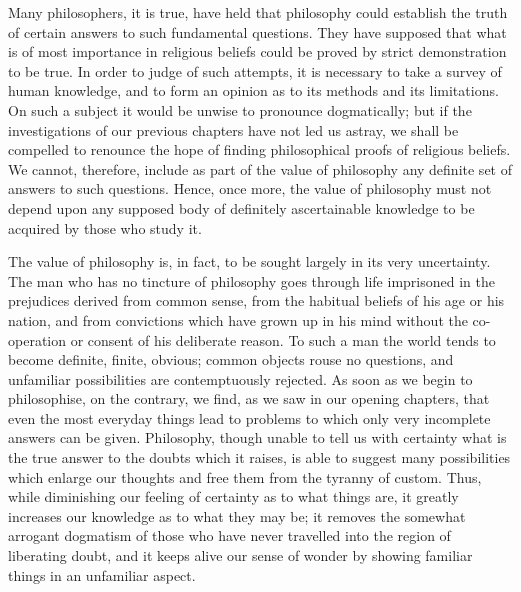 Many philosophers, it is true, have held that philosophy could
establish the truth of certain answers to such fundamental questions.
They have supposed that what is of most importance in religious
beliefs could be proved by strict demonstration to be true. In order
to judge of such attempts, it is necessary to take a survey of human
knowledge, and to form an opinion as to its methods and its
limitations. On such a subject it would be unwise to pronounce
dogmatically; but if the investigations of our previous chapters have
not led us astray, we shall be compelled to renounce the hope of
finding philosophical proofs of religious beliefs. We cannot,
therefore, include as part of the value of philosophy any definite set
of answers to such questions. Hence, once more, the value of
philosophy must not depend upon any supposed body of definitely
ascertainable knowledge to be acquired by those who study it.

The value of philosophy is, in fact, to be sought largely in its very
uncertainty. The  man who has no tincture of philosophy goes
through life imprisoned in the prejudices derived from common sense,
from the habitual beliefs of his age or his nation, and from
convictions which have grown up in his mind without the co-operation
or consent of his deliberate reason. To such a man the world tends to
become definite, finite, obvious; common objects rouse no questions,
and unfamiliar possibilities are contemptuously rejected. As soon as
we begin to philosophise, on the contrary, we find, as we saw in our
opening chapters, that even the most everyday things lead to problems
to which only very incomplete answers can be given. Philosophy, though
unable to tell us with certainty what is the true answer to the doubts
which it raises, is able to suggest many possibilities which enlarge
our thoughts and free them from the tyranny of custom. Thus, while
diminishing our feeling of certainty as to what things are, it greatly
increases our knowledge as to what they may be; it removes the
somewhat arrogant dogmatism of those who have never travelled into the
region of liberating  doubt, and it keeps alive our sense of
wonder by showing familiar things in an unfamiliar aspect.

